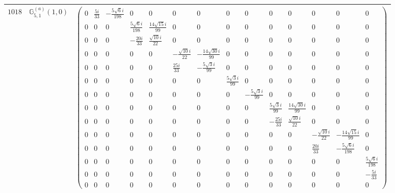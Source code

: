 \documentclass[fleqn,8pt,landscape]{jsarticle}
\begin{document}
\begin{center}
\begin{longtable}{ccc}
$ 1018 $ & $ \mathbb{G}_{5,1}^{(a)}(1,0) $ & $ \begin{pmatrix} 0 & \frac{5 i}{33} & - \frac{5 \sqrt{6} i}{198} & 0 & 0 & 0 & 0 & 0 & 0 & 0 & 0 & 0 & 0 & 0 \\ 0 & 0 & 0 & \frac{5 \sqrt{6} i}{198} & \frac{14 \sqrt{15} i}{99} & 0 & 0 & 0 & 0 & 0 & 0 & 0 & 0 & 0 \\ 0 & 0 & 0 & - \frac{20 i}{33} & \frac{\sqrt{10} i}{22} & 0 & 0 & 0 & 0 & 0 & 0 & 0 & 0 & 0 \\ 0 & 0 & 0 & 0 & 0 & - \frac{\sqrt{10} i}{22} & - \frac{14 \sqrt{30} i}{99} & 0 & 0 & 0 & 0 & 0 & 0 & 0 \\ 0 & 0 & 0 & 0 & 0 & \frac{25 i}{33} & - \frac{5 \sqrt{3} i}{99} & 0 & 0 & 0 & 0 & 0 & 0 & 0 \\ 0 & 0 & 0 & 0 & 0 & 0 & 0 & \frac{5 \sqrt{3} i}{99} & 0 & 0 & 0 & 0 & 0 & 0 \\ 0 & 0 & 0 & 0 & 0 & 0 & 0 & 0 & - \frac{5 \sqrt{3} i}{99} & 0 & 0 & 0 & 0 & 0 \\ 0 & 0 & 0 & 0 & 0 & 0 & 0 & 0 & 0 & \frac{5 \sqrt{3} i}{99} & \frac{14 \sqrt{30} i}{99} & 0 & 0 & 0 \\ 0 & 0 & 0 & 0 & 0 & 0 & 0 & 0 & 0 & - \frac{25 i}{33} & \frac{\sqrt{10} i}{22} & 0 & 0 & 0 \\ 0 & 0 & 0 & 0 & 0 & 0 & 0 & 0 & 0 & 0 & 0 & - \frac{\sqrt{10} i}{22} & - \frac{14 \sqrt{15} i}{99} & 0 \\ 0 & 0 & 0 & 0 & 0 & 0 & 0 & 0 & 0 & 0 & 0 & \frac{20 i}{33} & - \frac{5 \sqrt{6} i}{198} & 0 \\ 0 & 0 & 0 & 0 & 0 & 0 & 0 & 0 & 0 & 0 & 0 & 0 & 0 & \frac{5 \sqrt{6} i}{198} \\ 0 & 0 & 0 & 0 & 0 & 0 & 0 & 0 & 0 & 0 & 0 & 0 & 0 & - \frac{5 i}{33} \\ 0 & 0 & 0 & 0 & 0 & 0 & 0 & 0 & 0 & 0 & 0 & 0 & 0 & 0 \end{pmatrix} $ \\ \hline

\end{longtable}
\end{center}
\end{document}
